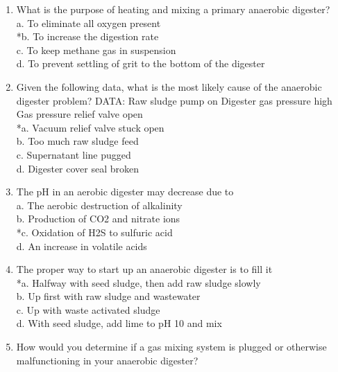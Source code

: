 \documentclass{article}
\begin{document}
\begin{enumerate}
\item  What is the purpose of heating and mixing a primary anaerobic digester? \\

a. To eliminate all oxygen present \\
*b. To increase the digestion rate \\
c. To keep methane gas in suspension \\
d. To prevent settling of grit to the bottom of the digester \\

\item  Given the following data, what is the most likely cause of the anaerobic digester problem?
DATA:    Raw sludge pump on
                Digester gas pressure high
                Gas pressure relief valve open \\

*a. Vacuum relief valve stuck open \\
b. Too much raw sludge feed \\
c. Supernatant line pugged \\
d. Digester cover seal broken \\

\item  The pH in an aerobic digester may decrease due to \\

a. The aerobic destruction of alkalinity \\
b. Production of CO2 and nitrate ions \\
*c. Oxidation of H2S to sulfuric acid \\
d. An increase in volatile acids \\

\item  The proper way to start up an anaerobic digester is to fill it \\

*a. Halfway with seed sludge, then add raw sludge slowly \\
b. Up first with raw sludge and wastewater \\
c. Up with waste activated sludge \\
d. With seed sludge, add lime to pH 10 and mix \\

\item  How would you determine if a gas mixing system is plugged or otherwise malfunctioning in your anaerobic digester? \\


\end{enumerate}
\end{document}
